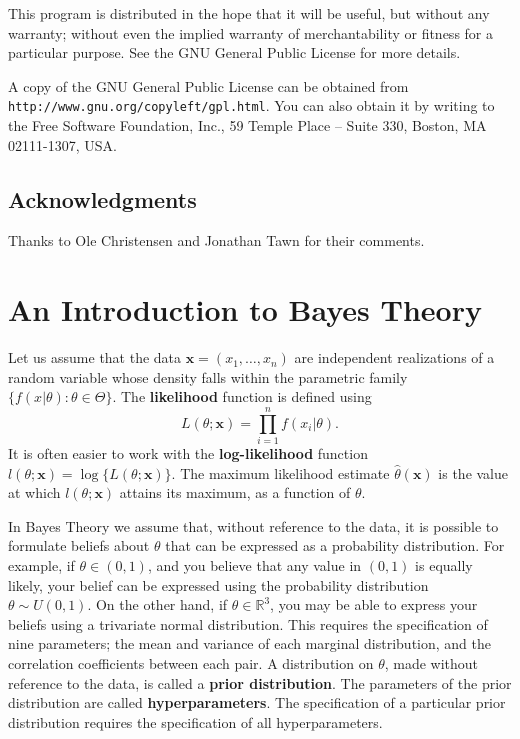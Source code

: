 \documentclass[11pt,a4paper]{article}
\newcommand{\bs}{\boldsymbol}
\begin{document}
This program is distributed in the hope that it will be useful,
but without any warranty; without even the implied warranty of
merchantability or fitness for a particular purpose.  
See the GNU General Public License for more details.

A copy of the GNU General Public License can be obtained from 
\verb+http://www.gnu.org/copyleft/gpl.html+.
You can also obtain it by writing to the Free Software Foundation, 
Inc., 59 Temple Place -- Suite 330, Boston, MA 02111-1307, USA.

\subsection{Acknowledgments}

Thanks to Ole Christensen and Jonathan Tawn for their comments.

\section{An Introduction to Bayes Theory}
\setcounter{footnote}{0}
\label{bayes}

Let us assume that the data $\bs{x} = (x_1,\dots,x_n)$ are independent realizations of a random variable whose density falls within the parametric family $\{f(x|\theta):\theta \in \Theta\}$.
The \textbf{likelihood} function is defined using
\begin{equation*}
L(\theta;\bs{x}) = \prod_{i=1}^n f(x_i|\theta).
\end{equation*} 
It is often easier to work with the \textbf{log-likelihood} function $l(\theta;\bs{x}) = \log\{L(\theta;\bs{x})\}$.
The maximum likelihood estimate $\hat{\theta}(\bs{x})$ is the value at which $l(\theta;\bs{x})$ attains its maximum, as a function of $\theta$.


In Bayes Theory we assume that, without reference to the data, it is possible to formulate beliefs about $\theta$ that can be expressed as a probability distribution. 
For example, if $\theta \in (0,1)$, and you believe that any value in $(0,1)$ is equally likely, your belief can be expressed using the probability distribution $\theta \sim U(0,1)$. 
On the other hand, if $\theta \in \mathbb{R}^3$, you may be able to express your beliefs using a trivariate normal distribution. 
This requires the specification of nine parameters; the mean and variance of each marginal distribution, and the correlation coefficients between each pair.  
A distribution on $\theta$, made without reference to the data, is called a \textbf{prior distribution}.
The parameters of the prior distribution are called \textbf{hyperparameters}.
The specification of a particular prior distribution requires the specification of all hyperparameters.
\end{document}

